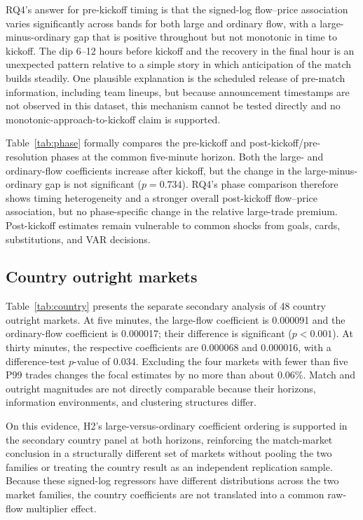 RQ4's answer for pre-kickoff timing is that the signed-log flow--price association varies significantly across bands for both large and ordinary flow, with a large-minus-ordinary gap that is positive throughout but not monotonic in time to kickoff. The dip 6--12 hours before kickoff and the recovery in the final hour is an unexpected pattern relative to a simple story in which anticipation of the match builds steadily. One plausible explanation is the scheduled release of pre-match information, including team lineups, but because announcement timestamps are not observed in this dataset, this mechanism cannot be tested directly and no monotonic-approach-to-kickoff claim is supported.

Table~\ref{tab:phase} formally compares the pre-kickoff and post-kickoff/pre-resolution phases at the common five-minute horizon. Both the large- and ordinary-flow coefficients increase after kickoff, but the change in the large-minus-ordinary gap is not significant ($p=0.734$). RQ4's phase comparison therefore shows timing heterogeneity and a stronger overall post-kickoff flow--price association, but no phase-specific change in the relative large-trade premium. Post-kickoff estimates remain vulnerable to common shocks from goals, cards, substitutions, and VAR decisions.



\subsection{Country outright markets}

Table~\ref{tab:country} presents the separate secondary analysis of 48 country outright markets. At five minutes, the large-flow coefficient is 0.000091 and the ordinary-flow coefficient is 0.000017; their difference is significant ($p<0.001$). At thirty minutes, the respective coefficients are 0.000068 and 0.000016, with a difference-test $p$-value of 0.034. Excluding the four markets with fewer than five P99 trades changes the focal estimates by no more than about 0.06\%. Match and outright magnitudes are not directly comparable because their horizons, information environments, and clustering structures differ.

On this evidence, H2's large-versus-ordinary coefficient ordering is supported in the secondary country panel at both horizons, reinforcing the match-market conclusion in a structurally different set of markets without pooling the two families or treating the country result as an independent replication sample. Because these signed-log regressors have different distributions across the two market families, the country coefficients are not translated into a common raw-flow multiplier effect.

